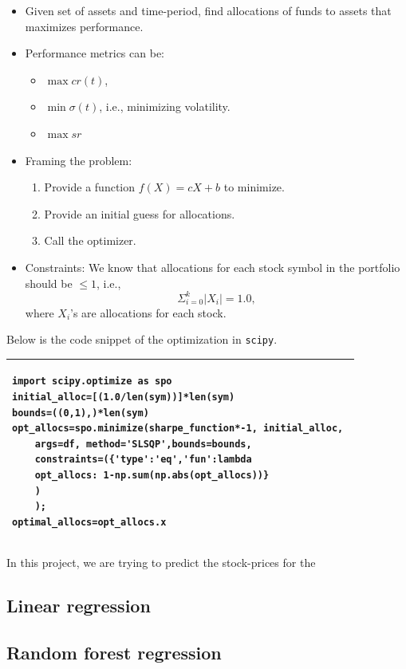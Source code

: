 \documentclass[12pt]{article}
\begin{document}
\begin{itemize}
\begin{itemize}
\item Given set of assets and time-period, find allocations of funds to assets that maximizes performance.
\item Performance metrics can be:
\begin{itemize}
\item $\max cr(t)$,
\item $\min \sigma(t)$, i.e., minimizing volatility.
\item $\max sr$
\end{itemize}
\item Framing the problem:
\begin{enumerate}
\item Provide a function $f(X)=cX+b$ to minimize.
\item Provide an initial guess for allocations.
\item Call the optimizer.
\end{enumerate}
\item Constraints: We know that allocations for each stock symbol in the portfolio should be $\leq 1$, i.e.,
\[ \Sigma_{i=0}^{k} |X_i|=1.0,
	\]
where $X_i$'s are allocations for each stock.
\end{itemize}

Below is the code snippet of the optimization in \texttt{scipy}.

\begin{tabular}{@{}|p{12.5cm}|@{}}
\hline
\begin{verbatim}
import scipy.optimize as spo
initial_alloc=[(1.0/len(sym))]*len(sym) 
bounds=((0,1),)*len(sym) 
opt_allocs=spo.minimize(sharpe_function*-1, initial_alloc, 
	args=df, method='SLSQP',bounds=bounds,
	constraints=({'type':'eq','fun':lambda
	opt_allocs: 1-np.sum(np.abs(opt_allocs))}
	)
	); 
optimal_allocs=opt_allocs.x 
\end{verbatim}
\\
\hline
\end{tabular}

In this project, we are trying to predict the stock-prices for the 

\subsection{Linear regression}
\label{sec:lr}

\subsection{Random forest regression}
\label{sec:rfr}


\end{itemize}
\end{document}
